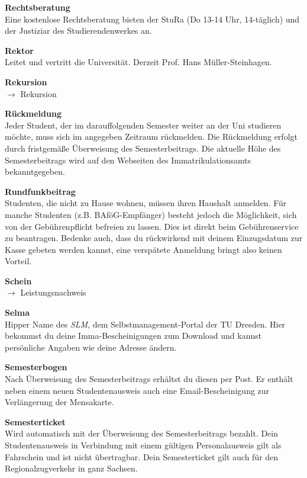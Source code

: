 \begin{multicols}{2}
\vfill\columnbreak

\textbf{Rechtsberatung} \\
Eine kostenlose Rechtsberatung bieten der StuRa (Do 13-14 Uhr, 14-täglich)  und der Justiziar des Studierendenwerkes an.

\textbf{Rektor} \\
Leitet und vertritt die Universität.
Derzeit Prof. Hans Müller-Steinhagen.

\textbf{Rekursion} \\
$\rightarrow$ Rekursion

\textbf{Rückmeldung} \\
Jeder Student, der im darauffolgenden Semester weiter an der Uni studieren möchte, muss sich im angegeben Zeitraum rückmelden.
Die Rückmeldung erfolgt durch fristgemäße Überweisung des Semesterbeitrags.
Die aktuelle Höhe des Semesterbeitrags wird auf den Webseiten des Immatrikulationsamts bekanntgegeben. 

\textbf{Rundfunkbeitrag} \\
Studenten, die nicht zu Hause wohnen, müssen ihren Haushalt anmelden.
Für manche Studenten (z.B. BAföG-Empfänger) besteht jedoch die Möglichkeit, sich von der Gebührenpflicht befreien zu lassen.
Dies ist direkt beim Gebührenservice zu beantragen.
Bedenke auch, dass du rückwirkend mit deinem Einzugsdatum zur Kasse gebeten werden kannst, eine verspätete Anmeldung bringt also keinen Vorteil.

\textbf{Schein} \\
$\rightarrow$ Leistungsnachweis

\textbf{Selma} \\
Hipper Name des \textit{SLM}, dem Selbst\-management-Portal der TU Dresden.
Hier bekommst du deine Imma-Bescheinigungen zum Download und kannst persönliche Angaben wie deine Adresse ändern. 

\textbf{Semesterbogen} \\
Nach Überweisung des Semesterbeitrags erhältst du diesen per Post.
Er enthält neben einem neuen Studentenausweis auch eine Email-Bescheinigung zur Verlängerung der Mensakarte.

\textbf{Semesterticket} \\
Wird automatisch mit der Überweisung des Semesterbeitrags bezahlt.
Dein Studentenausweis in Verbindung mit einem gültigen Personalausweis gilt als Fahrschein und ist nicht übertragbar.
Dein Semesterticket gilt auch für den Regionalzugverkehr in ganz Sachsen.


\end{multicols}
